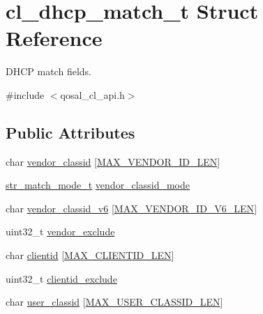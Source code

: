 \hypertarget{structcl__dhcp__match__t}{\section{cl\-\_\-dhcp\-\_\-match\-\_\-t Struct Reference}
\label{structcl__dhcp__match__t}
}


D\-H\-C\-P match fields.  




{\ttfamily \#include $<$qosal\-\_\-cl\-\_\-api.\-h$>$}

\subsection*{Public Attributes}
\begin{DoxyCompactItemize}
\item 
char \hyperlink{structcl__dhcp__match__t_a34232c984c0714c21469ae1194f2270f}{vendor\-\_\-classid} \mbox{[}\hyperlink{group__FAPI__QOS__CLASS_gab08625a5eeb8582d69b40054201d9116}{M\-A\-X\-\_\-\-V\-E\-N\-D\-O\-R\-\_\-\-I\-D\-\_\-\-L\-E\-N}\mbox{]}
\item 
\hyperlink{group__FAPI__QOS__CLASS_ga002c716c5dae6e4be5433e1f11659cdb}{str\-\_\-match\-\_\-mode\-\_\-t} \hyperlink{structcl__dhcp__match__t_ae881ec5da3e1f70dbb600f526c5698e0}{vendor\-\_\-classid\-\_\-mode}
\item 
char \hyperlink{structcl__dhcp__match__t_a09ecab3ee355fd73a5898de14c86d20d}{vendor\-\_\-classid\-\_\-v6} \mbox{[}\hyperlink{group__FAPI__QOS__CLASS_ga2f264f80b185aa3d6b10d73051b5ca33}{M\-A\-X\-\_\-\-V\-E\-N\-D\-O\-R\-\_\-\-I\-D\-\_\-\-V6\-\_\-\-L\-E\-N}\mbox{]}
\item 
uint32\-\_\-t \hyperlink{structcl__dhcp__match__t_a4226ed14571461835822f97c2f0ea85c}{vendor\-\_\-exclude}
\item 
char \hyperlink{structcl__dhcp__match__t_a470963491f6c59a80fd70132406a7085}{clientid} \mbox{[}\hyperlink{group__FAPI__QOS__CLASS_gaff8356674e70c7efac546eee41ed1651}{M\-A\-X\-\_\-\-C\-L\-I\-E\-N\-T\-I\-D\-\_\-\-L\-E\-N}\mbox{]}
\item 
uint32\-\_\-t \hyperlink{structcl__dhcp__match__t_a3d01140b8ad2771af007bc6b338f67d9}{clientid\-\_\-exclude}
\item 
char \hyperlink{structcl__dhcp__match__t_a43948e837781a5411afbf92f86b6ef9d}{user\-\_\-classid} \mbox{[}\hyperlink{group__FAPI__QOS__CLASS_ga668aa676079b70d11fd2f1ef9044dcfb}{M\-A\-X\-\_\-\-U\-S\-E\-R\-\_\-\-C\-L\-A\-S\-S\-I\-D\-\_\-\-L\-E\-N}\mbox{]}

\end{DoxyCompactItemize}

